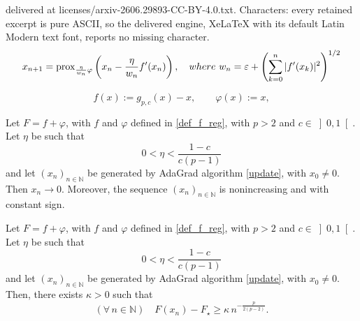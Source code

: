 \documentclass[10pt,a4paper]{amsart}
\newcommand{\N}{\mathbb{N}}
\newcommand{\prox}{\operatorname{prox}}
\begin{document}
delivered at licenses/arxiv-2606.29893-CC-BY-4.0.txt. Characters: every retained excerpt is pure ASCII, so the delivered engine, XeLaTeX with its default Latin Modern text font, reports no missing character.
\begin{equation}\label{update}
    x_{n+1}
    =
    \prox_{\frac{\eta}{w_n}\varphi}
    \left(
        x_n-\frac{\eta}{w_n}f'(x_n)
    \right), \quad {\rm where}\,\, w_n
    =
    \varepsilon+
    \left(
        \sum_{k=0}^n |f'(x_k)|^2
    \right)^{1/2}
\end{equation}

\begin{equation}
\label{def_f_reg}
    f(x):=g_{p,c}(x)-x, \qquad \varphi(x):=x,
\end{equation}

\begin{lemma}
\label{lem:conv-zero}
Let $F=f+\varphi$, with $f$ and $\varphi$ defined in \eqref{def_f_reg}, with $p>2$ and $c\in \left]0,1\right[$.
Let $\eta$ be such that
\begin{equation*}
    0<\eta< \frac{1-c}{c(p-1)}
\end{equation*}
and let $(x_n)_{n\in \N}$ be generated by AdaGrad algorithm \eqref{update}, with $x_0\neq 0$.
Then \(x_n\to0\). Moreover, the sequence $(x_n)_{n\in \N}$ is nonincreasing and with constant sign.
\end{lemma}

\begin{theorem}
\label{lem:nonasymptotic-lower-bound}
Let $F=f+\varphi$, with $f$ and $\varphi$ defined in \eqref{def_f_reg}, with $p>2$ and $c\in \left]0,1\right[$.
Let $\eta$ be such that
\begin{equation*}
    0<\eta< \frac{1-c}{c(p-1)}
\end{equation*}
and let $(x_n)_{n\in \N}$ be generated by AdaGrad algorithm \eqref{update}, with $x_0\neq 0$. Then, there exists $\kappa>0$
such that
\begin{equation*}
(\forall\,n\in \N)\quad
    F(x_n)-F_\star
    \ge
    \kappa\,
    n^{-\frac{p}{2(p-2)}}.
\end{equation*}
\end{theorem}
\end{document}
